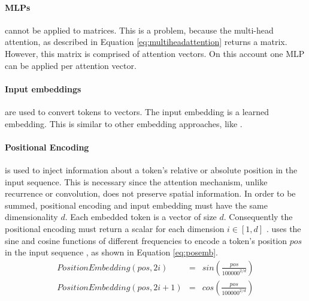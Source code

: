 	\paragraph{\ac{MLP}s} cannot be applied to matrices. This is a problem, because the multi-head attention, as described in Equation \eqref{eq:multiheadattention} returns a matrix. However, this matrix is comprised of attention vectors. On this account one \ac{MLP} can be applied per attention vector. \autocite{Vaswani.2017}
	\paragraph{Input embeddings} are used to convert tokens to vectors. The input embedding is a learned embedding. This is similar to other embedding approaches, like \cites{Wang.2012}{Turian.2010}{Mikolov.2013}{Mikolov.2013b}{Joulin.2016}{Smith.2019}{Pennington.2014}{McCann.2017}. \autocite{Vaswani.2017}
	\paragraph{Positional Encoding} is used to inject information about a token's relative or absolute position in the input sequence. This is necessary since the attention mechanism, unlike recurrence or convolution, does not preserve spatial information. In order to be summed, positional encoding and input embedding must have the same dimensionality $d$. Each embedded token is a vector of size $d$. Consequently the positional encoding must return a scalar for each dimension $i \in [1,d]$ \autocite{Vaswani.2017}. \cite{Vaswani.2017} uses the sine and cosine functions of different frequencies to encode a token's position $pos$ in the input sequence , as shown in Equation \eqref{eq:posemb}.
	\begin{equation}
		\label{eq:posemb}
		\begin{array}{rcl}
			PositionEmbedding(pos,2i) & = & sin(\frac{pos}{100000^{2 / d}}) \\
			PositionEmbedding(pos,2i+1) & = & cos(\frac{pos}{100000^{2 / d}})
		\end{array}
	\end{equation}
		
